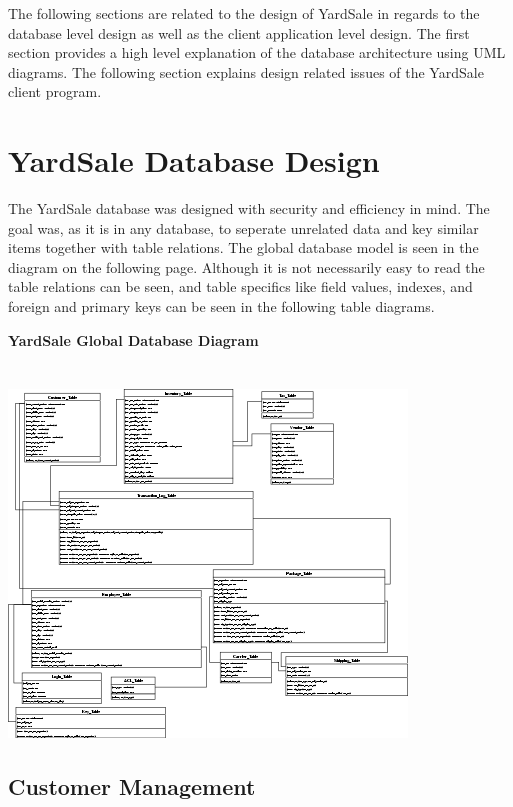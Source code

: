 \documentclass{report}
\begin{document}
    The following sections are related to the design of YardSale
    in regards to the database level design as well as the client
    application level design. The first section provides a high level
    explanation of the database architecture using UML diagrams. The
    following section explains design related issues of the YardSale
    client program.

\section{YardSale Database Design}

    The YardSale database was designed with security and efficiency in
    mind. The goal was, as it is in any database, to seperate unrelated
    data and key similar items together with table relations. The global
    database model is seen in the diagram on the following page. Although
    it is not necessarily easy to read the table relations can be seen, and
    table specifics like field values, indexes, and foreign and primary keys
    can be seen in the following table diagrams.

    \newpage

    {\bf YardSale Global Database Diagram}\\
    \\
    \\
    \includegraphics{Database_Layout.png}

    \newpage

    \subsection{Customer Management}
\end{document}
